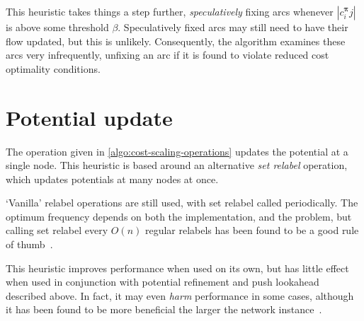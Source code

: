 This heuristic takes things a step further, \emph{speculatively} fixing arcs whenever $\left|c^{\boldsymbol{\pi}}_ij\right|$ is above some threshold $\beta$. Speculatively fixed arcs may still need to have their flow updated, but this is unlikely. Consequently, the algorithm examines these arcs very infrequently, unfixing an arc if it is found to violate reduced cost optimality conditions.

\section{Potential update}
The  operation given in \cref{algo:cost-scaling-operations} updates the potential at a single node. This heuristic is based around an alternative \emph{set relabel} operation, which updates potentials at many nodes at once.

`Vanilla' relabel operations are still used, with set relabel called periodically. The optimum frequency depends on both the implementation, and the problem, but calling set relabel every $O(n)$ regular relabels has been found to be a good rule of thumb~\cite{Goldberg:1997}.

This heuristic improves performance when used on its own, but has little effect when used in conjunction with potential refinement and push lookahead described above. In fact, it may even \emph{harm} performance in some cases, although it has been found to be more beneficial the larger the network instance~\cite{Bunnagel:1998}.
